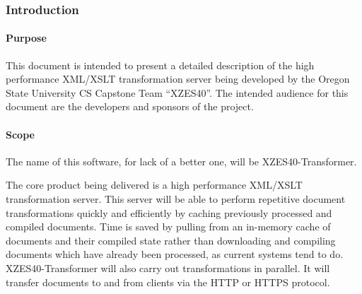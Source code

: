 \subsubsection{Introduction}

\paragraph{Purpose}

This document is intended to present a detailed description of the high performance XML/XSLT transformation server being developed by the Oregon State University CS Capstone Team ``XZES40''.
The intended audience for this document are the developers and sponsors of the project.


\paragraph{Scope}

The name of this software, for lack of a better one, will be XZES40-Transformer.

The core product being delivered is a high performance XML/XSLT transformation server.
This server will be able to perform repetitive document transformations quickly and efficiently by caching previously processed and compiled documents.
Time is saved by pulling from an in-memory cache of documents and their compiled state rather than downloading and compiling documents which have already been processed, as current systems tend to do.
XZES40-Transformer will also carry out transformations in parallel.
It will transfer documents to and from clients via the HTTP or HTTPS protocol.

